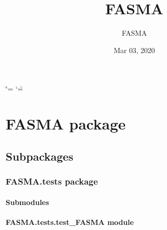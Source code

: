 \documentclass[letterpaper,10pt,english]{sphinxmanual}
\title{FASMA}
\date{Mar 03, 2020}
\author{FASMA}
\begin{document}
\ifdefined\shorthandoff
  \ifnum\catcode`\=\string=\active\shorthandoff{=}\fi
  \ifnum\catcode`\"=\active{}\fi
\fi

\pagestyle{empty}
\sphinxmaketitle
\pagestyle{plain}
\sphinxtableofcontents
\pagestyle{normal}
\label{\detokenize{index::doc}}



\chapter{FASMA package}
\label{\detokenize{index:fasma-package}}

\section{Subpackages}
\label{\detokenize{index:subpackages}}

\subsection{FASMA.tests package}
\label{\detokenize{FASMA.tests:fasma-tests-package}}\label{\detokenize{FASMA.tests::doc}}

\subsubsection{Submodules}
\label{\detokenize{FASMA.tests:submodules}}

\subsubsection{FASMA.tests.test\_FASMA module}
\label{\detokenize{FASMA.tests:module-FASMA.tests.test_FASMA}}\label{\detokenize{FASMA.tests:fasma-tests-test-fasma-module}}
\end{document}

